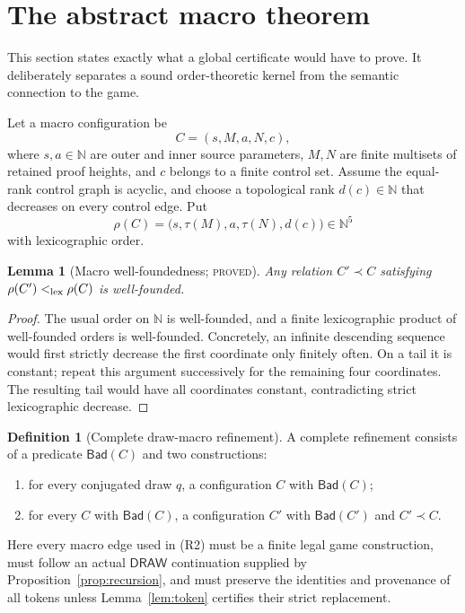 \documentclass[11pt]{article}
\newtheorem{lemma}[theorem]{Lemma}
\theoremstyle{definition}
\newtheorem{definition}[theorem]{Definition}
\newcommand{\Draw}{\mathsf{DRAW}}
\newcommand{\N}{\mathbb N}
\newcommand{\proved}{\textsc{proved}}
\begin{document}
\section{The abstract macro theorem}

This section states exactly what a global certificate would have to prove.
It deliberately separates a sound order-theoretic kernel from the semantic
connection to the game.

Let a macro configuration be
\[
  C=(s,M,a,N,c),
\]
where $s,a\in\N$ are outer and inner source parameters, $M,N$ are finite
multisets of retained proof heights, and $c$ belongs to a finite control set.
Assume the equal-rank control graph is acyclic, and choose a topological rank
$d(c)\in\N$ that decreases on every control edge.  Put
\[
 \rho(C)=\bigl(s,\tau(M),a,\tau(N),d(c)\bigr)\in\N^5
\]
with lexicographic order.

\begin{lemma}[Macro well-foundedness; \proved]\label{lem:macrowf}
Any relation $C'\prec C$ satisfying $\rho(C')<_{\rm lex}\rho(C)$ is
well-founded.
\end{lemma}

\begin{proof}
The usual order on $\N$ is well-founded, and a finite lexicographic product of
well-founded orders is well-founded.  Concretely, an infinite descending
sequence would first strictly decrease the first coordinate only finitely
often.  On a tail it is constant; repeat this argument successively for the
remaining four coordinates.  The resulting tail would have all coordinates
constant, contradicting strict lexicographic decrease.
\end{proof}

\begin{definition}[Complete draw-macro refinement]\label{def:refinement}
A complete refinement consists of a predicate $\mathsf{Bad}(C)$ and two
constructions:
\begin{enumerate}
\item[(R1)] for every conjugated draw $q$, a configuration $C$ with
      $\mathsf{Bad}(C)$;
\item[(R2)] for every $C$ with $\mathsf{Bad}(C)$, a configuration $C'$ with
      $\mathsf{Bad}(C')$ and $C'\prec C$.
\end{enumerate}
Here every macro edge used in (R2) must be a finite legal game construction,
must follow an actual $\Draw$ continuation supplied by
Proposition~\ref{prop:recursion}, and must preserve the identities and
provenance of all tokens unless Lemma~\ref{lem:token} certifies their strict
replacement.
\end{definition}
\end{document}
